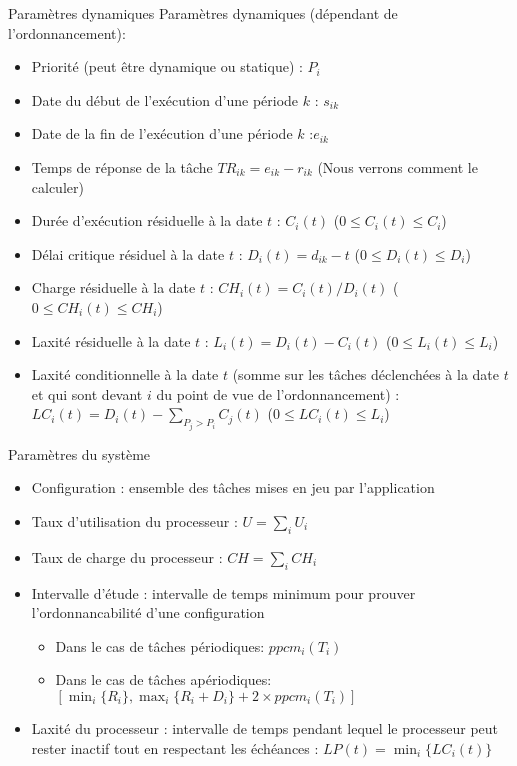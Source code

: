 \begin{frame}{Paramètres dynamiques}
  Paramètres dynamiques (dépendant de l'ordonnancement):
  \begin{itemize} 
  \item Priorité (peut être dynamique ou statique) : $P_i$
  \item Date du début de l'exécution d'une période $k$ : $s_{ik}$
  \item Date de la fin de l'exécution d'une période $k$ :$e_{ik}$
  \item Temps de réponse de la tâche $TR_{ik} = e_{ik} - r_{ik}$ (Nous
    verrons comment le calculer)
  \item Durée d'exécution résiduelle à la date $t$ : $C_i(t)$ ($0 ≤
    C_i(t) ≤ C_i$)
  \item Délai  critique résiduel à la  date $t$ :  $D_i(t) = d_{ik}-t$
    ($0 ≤ D_i(t) ≤ D_i$)
  \item Charge résiduelle à la date $t$ :
    $CH_i(t) = C_i(t) / D_i(t)$  ($0 ≤ CH_i(t) ≤ CH_i$)
  \item Laxité  résiduelle à la  date $t$ :
    $L_i(t) = D_i(t) - C_i(t)$  ($0  ≤ L_i(t) ≤  L_i$)
  \item  Laxité conditionnelle  à la  date $t$  (somme sur  les tâches
    déclenchées à la  date $t$ et qui sont devant $i$  du point de vue
    de  l'ordonnancement)  :  $LC_i(t)  =  D_i(t)  -  \sum_{P_j  >
      P_i} C_j(t)$ ($0 ≤ LC_i(t) ≤ L_i$)
  \end{itemize} 
\end{frame}


\begin{frame}{Paramètres du système}
  \begin{itemize} 
  \item  Configuration  :  ensemble   des  tâches  mises  en  jeu  par
    l'application
  \item Taux d'utilisation du processeur : $U = \sum_i U_i$
  \item Taux de charge du processeur : $CH = \sum_i CH_i$
  \item Intervalle d'étude :  intervalle de temps minimum pour prouver
    l'ordonnancabilité  d'une  configuration
    \begin{itemize} 
    \item  Dans  le  cas de  tâches périodiques: $ppcm_i(T_i)$
    \item  Dans le cas  de tâches  apériodiques: $\left[\min_i\{R_i\},
        \max_i\{R_i + D_i\} + 2 \times ppcm_i(T_i)\right]$
    \end{itemize} 
  \item Laxité du  processeur : intervalle de temps  pendant lequel le
    processeur peut rester inactif  tout en respectant les échéances :
    $ LP(t) = \min_i\{LC_i(t)\}$
  \end{itemize} 
\end{frame} 

